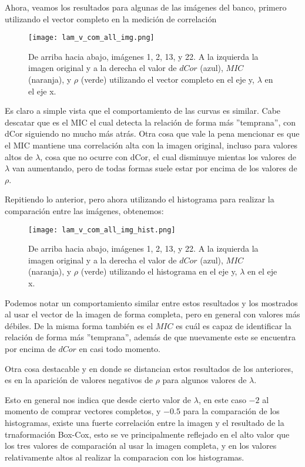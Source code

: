    Ahora, veamos los resultados para algunas de las im\'agenes del banco, primero utilizando el vector completo en la medici\'on de correlaci\'on  

    \begin{figure}[H]
        \centering
        \texttt{[image: lam\_v\_com\_all\_img.png]}
        \caption{De arriba hacia abajo, im\'agenes 1, 2, 13, y 22. A la izquierda la imagen original y a la derecha el valor de $dCor$ (azul), $MIC$ (naranja), y $\rho$ (verde) utilizando el vector completo en el eje y, $\lambda$ en el eje x.}
    \end{figure}


    Es claro a simple vista que el comportamiento de las curvas es similar. Cabe descatar que es el MIC el cual detecta la relaci\'on de forma m\'as ''temprana'', con dCor siguiendo no mucho m\'as atr\'as. Otra cosa que vale la pena mencionar es que el MIC mantiene una correlaci\'on alta con la imagen original, incluso para valores altos de $\lambda$, cosa que no ocurre con dCor, el cual disminuye mientas los valores de $\lambda$ van aumentando, pero de todas formas suele estar por encima de los valores de $\rho$.

    Repitiendo lo anterior, pero ahora utilizando el histograma para realizar la comparaci\'on entre las im\'agenes, obtenemos:

    \begin{figure}[H]
        \centering
        \texttt{[image: lam\_v\_com\_all\_img\_hist.png]}
        \caption{De arriba hacia abajo, im\'agenes 1, 2, 13, y 22. A la izquierda la imagen original y a la derecha el valor de $dCor$ (azul), $MIC$ (naranja), y $\rho$ (verde) utilizando el histograma en el eje y, $\lambda$ en el eje x.}
    \end{figure}

        Podemos notar un comportamiento similar entre estos resultados y los mostrados al usar el vector de la imagen de forma completa, pero en general con valores m\'as d\'ebiles. De la misma forma tambi\'en es el $MIC$ es cu\'al es capaz de identificar la relaci\'on de forma m\'as ''temprana'', adem\'as de que nuevamente este se encuentra por encima de $dCor$ en casi todo momento.

        Otra cosa destacable y en donde se distancian estos resultados de los anteriores, es en la aparici\'on de valores negativos de $\rho$ para algunos valores de $\lambda$. 

        Esto en general nos indica que desde cierto valor de $\lambda$, en este caso $-2$ al momento de comprar vectores completos, y $-0.5$ para la comparaci\'on de los histogramas, existe una fuerte correlaci\'on entre la imagen y el resultado de la trnaformaci\'on Box-Cox, esto se ve principalmente reflejado en el alto valor que los tres valores de comparaci\'on al usar la imagen completa, y en los valores relativamente altos al realizar la comparacion con los histogramas. 

